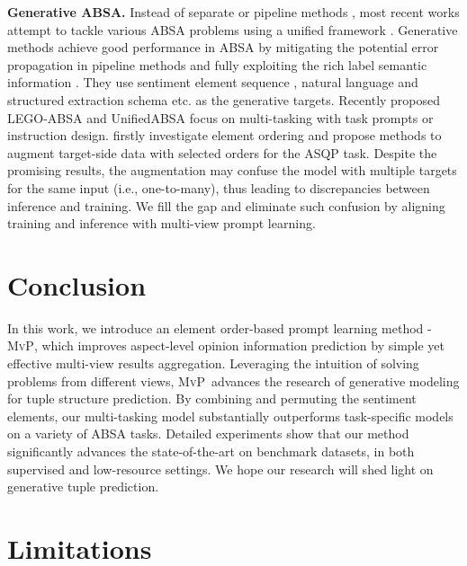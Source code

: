 \documentclass[11pt]{article}
\newcommand\mvp{\textsc{MvP}}
\begin{document}
\textbf{Generative ABSA.}
Instead of separate or pipeline methods \cite{phan-ogunbona-2020-modelling}, most recent works attempt to tackle various ABSA problems using a unified framework \cite{DBLP:journals/ijautcomp/SunLQH22}. Generative methods achieve good performance in ABSA by mitigating the potential error propagation in pipeline methods and fully exploiting the rich label semantic information \cite{DBLP:conf/iclr/PaoliniAKMAASXS21, DBLP:journals/corr/abs-2203-01054, yu2023syngen}.
They use sentiment element sequence \cite{zhang-etal-2021-towards}, natural language \cite{liu-etal-2021-solving, zhang-etal-2021-aspect-sentiment} and  structured extraction schema \cite{lu-etal-2022-unified} etc. as the generative targets.
Recently proposed LEGO-ABSA \cite{gao-etal-2022-lego} and UnifiedABSA \cite{DBLP:journals/corr/abs-2211-10986} focus on multi-tasking with task prompts or instruction design.
\citet{hu-etal-2022-improving-aspect} firstly investigate element ordering and propose methods to augment target-side data with selected orders for the ASQP task.
Despite the promising results, the augmentation may confuse the model with multiple targets for the same input (i.e., one-to-many), thus leading to discrepancies between inference and training.
We fill the gap and eliminate such confusion by aligning training and inference with multi-view prompt learning.


 \section{Conclusion}

In this work, we introduce an element order-based prompt learning method - \mvp, which improves aspect-level opinion information prediction by simple yet effective multi-view results aggregation.
Leveraging the intuition of solving problems from different views, \mvp~advances the research of generative modeling for tuple structure prediction.
By combining and permuting the sentiment elements, our multi-tasking model substantially outperforms task-specific models on a variety of ABSA tasks.
Detailed experiments show that our method significantly advances the state-of-the-art on benchmark datasets, in both supervised and low-resource settings.
We hope our research will shed light on generative tuple prediction.
 
\section*{Limitations}
\end{document}

